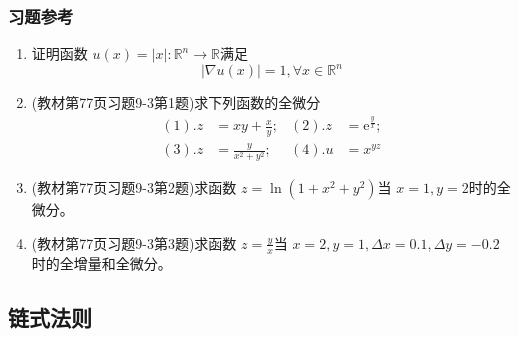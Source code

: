 \subsubsection{习题参考}
\begin{enumerate}
    \item 证明函数 $u(x)=|x|:\mathbb{R} ^n \to \mathbb{R}$满足
    $$
    |\nabla u(x) | = 1, \forall x \in \mathbb{R}^n
    $$
    
    \item (教材第77页习题9-3第1题)求下列函数的全微分
    \begin{align*}
    (1). z & = x y + \frac{x}{y}; &  (2). z &= \mathrm{e}^{\frac{y}{x}}; \\
    (3). z &= \frac{y}{x^2 + y^2}; & (4). u & = x^{yz}
    \end{align*}
    
    \item (教材第77页习题9-3第2题)求函数 $z = \ln (1+x^2 + y^2)$当 $x=1,y=2$时的全微分。
    
    \item (教材第77页习题9-3第3题)求函数 $z = \frac{y}{x}$当 $x=2,y=1, \Delta x = 0.1, \Delta y = -0.2$时的全增量和全微分。
\end{enumerate}

\subsection{链式法则}
